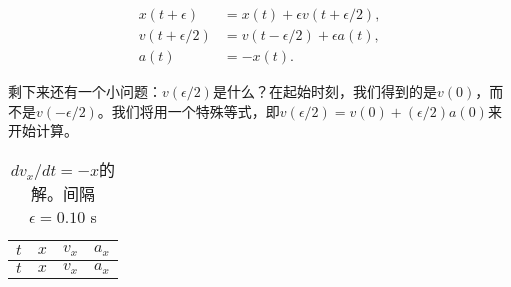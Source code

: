 \documentclass[12pt,oneside]{book}
\begin{document}
\begin{equation}
\begin{aligned}
x(t+\epsilon)&=x(t)+\epsilon v(t+\epsilon/2),\\
v(t+\epsilon/2)&=v(t-\epsilon/2)+\epsilon a(t),\\
a(t)&=-x(t).
\end{aligned}
\label{Eq:I:9:16}
\end{equation}

剩下来还有一个小问题：$ v(\epsilon/2) $是什么？在起始时刻，我们得到的是$ v(0) $，而不是$ v(-\epsilon/2) $。我们将用一个特殊等式，即$ v(\epsilon/2)=v(0)+(\epsilon/2)a(0) $来开始计算。


{
\renewcommand{\arraystretch}{0.8}  
\begin{longtable}{@{}llll@{}}
\caption{$dv_x/dt=-x  $的解。间隔$ \epsilon = 0.10 $ s}
\label{tab:表9-1} \\
\toprule
$t$     & $ x $     & $ v_x $     & $ a_x $      \\ \midrule
\endfirsthead

\toprule
$t$     & $ x $     & $ v_x $     & $ a_x $      \\ \midrule
\endhead


\end{longtable}}
\end{document}

